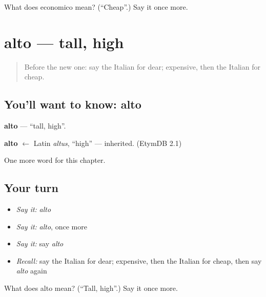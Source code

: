 \begin{tcolorbox}[breakable,colback=teal!4,colframe=teal!35!black,title={Before you move on}]
What does economico mean? (\textquotedblleft{}Cheap\textquotedblright{}.) Say it once more.
\end{tcolorbox}
\section[alto]{alto — tall, high}

\label{lesson:IT-C75-alto}



\begin{quote}
Before the new one: say the Italian for dear; expensive, then the Italian for cheap.
\end{quote}

\subsection*{You'll want to know: alto}
\textbf{alto} — \textquotedblleft{}tall, high\textquotedblright{}.

\begin{cousinweb}
\textbf{alto} $\leftarrow$ Latin \emph{altus}, \textquotedblleft{}high\textquotedblright{} — inherited. (EtymDB 2.1)
\end{cousinweb}

\begin{grammarlens}[title={What you've built}]
One more word for this chapter.
\end{grammarlens}

\subsection*{Your turn}
\begin{itemize}
\raggedright
  \item \emph{Say it:} \emph{alto}
  \item \emph{Say it:} \emph{alto}, once more
  \item \emph{Say it:} say \emph{alto}
  \item \emph{Recall:} say the Italian for dear; expensive, then the Italian for cheap, then say \emph{alto} again
\end{itemize}

\begin{tcolorbox}[breakable,colback=teal!4,colframe=teal!35!black,title={Before you move on}]
What does alto mean? (\textquotedblleft{}Tall, high\textquotedblright{}.) Say it once more.
\end{tcolorbox}
